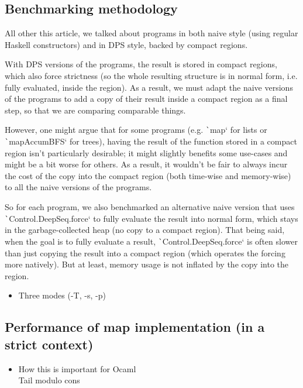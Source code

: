\documentclass[english]{jflart}
\newcommand{\TODO}[1]{{\color{red}\large #1}}
\begin{document}
\subsection{Benchmarking methodology}

All other this article, we talked about programs in both naive style (using regular Haskell constructors) and in DPS style, backed by compact regions.

With DPS versions of the programs, the result is stored in compact regions, which also force strictness (so the whole resulting structure is in normal form, i.e. fully evaluated, inside the region). As a result, we must adapt the naive versions of the programs to add a copy of their result inside a compact region as a final step, so that we are comparing comparable things.

However, one might argue that for some programs (e.g. \texttt`map` for lists or \texttt`mapAccumBFS` for trees), having the result of the function stored in a compact region isn't particularly desirable; it might slightly benefits some use-cases and might be a bit worse for others. As a result, it wouldn't be fair to always incur the cost of the copy into the compact region (both time-wise and memory-wise) to all the naive versions of the programs.

So for each program, we also benchmarked an alternative naive version that uses \texttt`Control.DeepSeq.force` to fully evaluate the result into normal form, which stays in the garbage-collected heap (no copy to a compact region). That being said, when the goal is to fully evaluate a result, \texttt`Control.DeepSeq.force` is often slower than just copying the result into a compact region (which operates the forcing more natively). But at least, memory usage is not inflated by the copy into the region.

\begin{itemize}
\item Three modes (-T, -s, -p)
\end{itemize}

\subsection{Performance of map implementation (in a strict context)}

\begin{itemize}
\item How this is important for Ocaml \\\TODO{Tail modulo cons}
\end{itemize}
\end{document}
